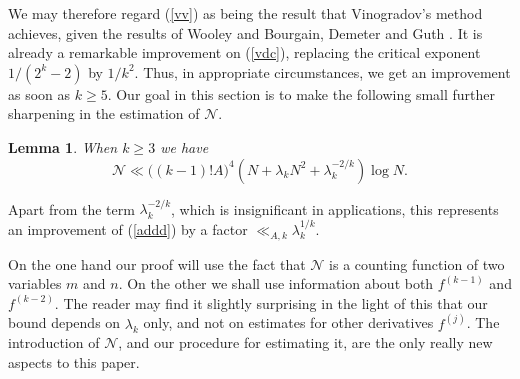 \documentclass[a4paper,10pt]{article}
\newcommand{\lk}{\lambda_k}
\newtheorem{lemma}{Lemma}
\begin{document}
We may therefore regard (\ref{vv}) as being the result that
Vinogradov's method achieves, given the results of Wooley \cite{W3}
and Bourgain, Demeter and Guth \cite{BDG}.  It is already a remarkable
improvement on (\ref{vdc}), replacing the critical exponent
$1/(2^k-2)$ by $1/k^2$.  Thus, in appropriate circumstances, we get 
an improvement as soon as $k\ge 5$.  Our goal in this section is to
make the following small further sharpening in the estimation of
$\mathcal{N}$. 
\begin{lemma}\label{N2}
When $k\ge 3$ we have
\[\mathcal{N}\ll
\big((k-1)!A\big)^4(N+\lk N^2+\lk^{-2/k})\log N.\]
\end{lemma}
Apart from the term $\lk^{-2/k}$, which is insignificant in
applications, this represents an improvement of (\ref{addd}) by a
factor $\ll_{A,k}\lk^{1/k}$. 

On the one hand our proof will use the fact that $\mathcal{N}$ is a counting
function of two variables $m$ and $n$.  On the other we shall use information
about both $f^{(k-1)}$ and $f^{(k-2)}$.  The reader may find it
slightly surprising in the light of this that our bound depends on
$\lk$ only, and not on estimates for other derivatives $f^{(j)}$. The
introduction of $\mathcal{N}$, and our procedure for estimating it,
are the only really new aspects to this paper.
\bigskip
\end{document}
